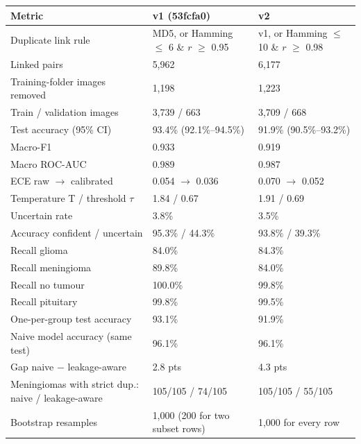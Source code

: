 \begin{tabular}{lll}
\toprule
Metric & v1 (53fcfa0) & v2 \\
\midrule
Duplicate link rule & MD5, or Hamming $\le$ 6 \& $r$ $\ge$ 0.95 & v1, or Hamming $\le$ 10 \& $r$ $\ge$ 0.98 \\
Linked pairs & 5,962 & 6,177 \\
Training-folder images removed & 1,198 & 1,223 \\
Train / validation images & 3,739 / 663 & 3,709 / 668 \\
Test accuracy (95\% CI) & 93.4\% (92.1\%--94.5\%) & 91.9\% (90.5\%--93.2\%) \\
Macro-F1 & 0.933 & 0.919 \\
Macro ROC-AUC & 0.989 & 0.987 \\
ECE raw $\to$ calibrated & 0.054 $\to$ 0.036 & 0.070 $\to$ 0.052 \\
Temperature T / threshold $\tau$ & 1.84 / 0.67 & 1.91 / 0.69 \\
Uncertain rate & 3.8\% & 3.5\% \\
Accuracy confident / uncertain & 95.3\% / 44.3\% & 93.8\% / 39.3\% \\
Recall glioma & 84.0\% & 84.3\% \\
Recall meningioma & 89.8\% & 84.0\% \\
Recall no tumour & 100.0\% & 99.8\% \\
Recall pituitary & 99.8\% & 99.5\% \\
One-per-group test accuracy & 93.1\% & 91.9\% \\
Naive model accuracy (same test) & 96.1\% & 96.1\% \\
Gap naive $-$ leakage-aware & 2.8 pts & 4.3 pts \\
Meningiomas with strict dup.: naive / leakage-aware & 105/105 / 74/105 & 105/105 / 55/105 \\
Bootstrap resamples & 1,000 (200 for two subset rows) & 1,000 for every row \\
\bottomrule
\end{tabular}
